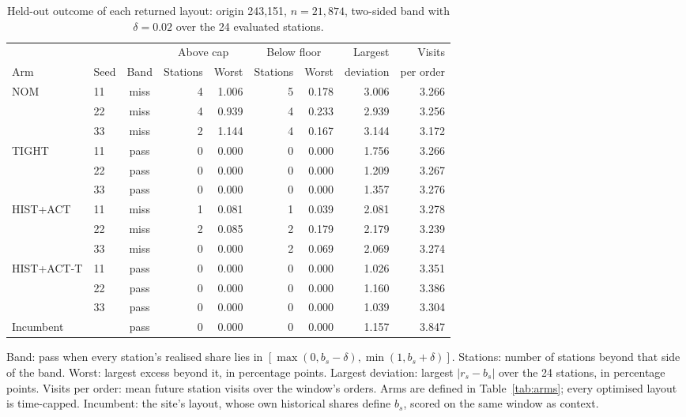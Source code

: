 \begin{table}[htbp]
\centering
\caption{Held-out outcome of each returned layout: origin 243,151, $n=21{,}874$, two-sided band with $\delta=0.02$ over the 24 evaluated stations.}
\label{tab:heldout_seeds}
\small
\setlength{\tabcolsep}{4pt}
\begin{tabular}{@{}llcrrrrrr@{}}
\toprule
 & & & \multicolumn{2}{c}{Above cap} & \multicolumn{2}{c}{Below floor} & Largest & Visits \\
\cmidrule(lr){4-5}\cmidrule(lr){6-7}
Arm & Seed & Band & Stations & Worst & Stations & Worst & deviation & per order \\
\midrule
NOM        & 11 & miss & 4 & 1.006 & 5 & 0.178 & 3.006 & 3.266 \\
           & 22 & miss & 4 & 0.939 & 4 & 0.233 & 2.939 & 3.256 \\
           & 33 & miss & 2 & 1.144 & 4 & 0.167 & 3.144 & 3.172 \\
\addlinespace
TIGHT      & 11 & pass & 0 & 0.000 & 0 & 0.000 & 1.756 & 3.266 \\
           & 22 & pass & 0 & 0.000 & 0 & 0.000 & 1.209 & 3.267 \\
           & 33 & pass & 0 & 0.000 & 0 & 0.000 & 1.357 & 3.276 \\
\addlinespace
HIST+ACT   & 11 & miss & 1 & 0.081 & 1 & 0.039 & 2.081 & 3.278 \\
           & 22 & miss & 2 & 0.085 & 2 & 0.179 & 2.179 & 3.239 \\
           & 33 & miss & 0 & 0.000 & 2 & 0.069 & 2.069 & 3.274 \\
\addlinespace
HIST+ACT-T & 11 & pass & 0 & 0.000 & 0 & 0.000 & 1.026 & 3.351 \\
           & 22 & pass & 0 & 0.000 & 0 & 0.000 & 1.160 & 3.386 \\
           & 33 & pass & 0 & 0.000 & 0 & 0.000 & 1.039 & 3.304 \\
\midrule
Incumbent  &    & pass & 0 & 0.000 & 0 & 0.000 & 1.157 & 3.847 \\
\bottomrule
\end{tabular}
\par\smallskip
\begin{minipage}{\linewidth}\footnotesize
Band: pass when every station's realised share lies in $[\max(0,b_s-\delta),\min(1,b_s+\delta)]$. Stations: number of stations beyond that side of the band. Worst: largest excess beyond it, in percentage points. Largest deviation: largest $|r_s-b_s|$ over the 24 stations, in percentage points. Visits per order: mean future station visits over the window's orders. Arms are defined in Table~\ref{tab:arms}; every optimised layout is time-capped. Incumbent: the site's layout, whose own historical shares define $b_s$, scored on the same window as context.
\end{minipage}
\end{table}

